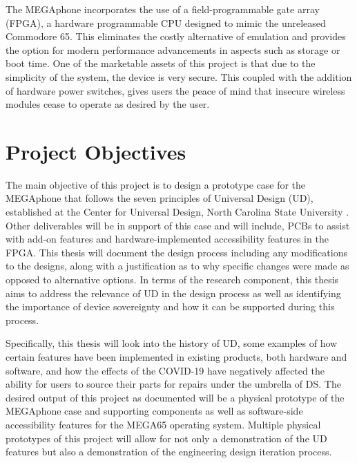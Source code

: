 The MEGAphone incorporates the use of a field-programmable gate array (FPGA), a hardware programmable CPU designed to mimic the unreleased Commodore 65.
This eliminates the costly alternative of emulation and provides the option for modern performance advancements in aspects such as storage or boot time.
One of the marketable assets of this project is that due to the simplicity of the system, the device is very secure.
This coupled with the addition of hardware power switches, gives users the peace of mind that insecure wireless modules cease to operate as desired by the user.

\section{Project Objectives}

The main objective of this project is to design a prototype case for the MEGAphone that follows the seven principles of Universal Design (UD), established at the Center for Universal Design, North Carolina State University \cite{sevenprinciples}. 
Other deliverables will be in support of this case and will include, PCBs to assist with add-on features and hardware-implemented accessibility features in the FPGA.
This thesis will document the design process including any modifications to the designs, along with a justification as to why specific changes were made as opposed to alternative options.
In terms of the research component, this thesis aims to address the relevance of UD in the design process as well as identifying the importance of device sovereignty and how it can be supported during this process.

Specifically, this thesis will look into the history of UD, some examples of how certain features have been implemented in existing products, both hardware and software, and how the effects of the COVID-19 have negatively affected the ability for users to source their parts for repairs under the umbrella of DS.
The desired output of this project as documented will be a physical prototype of the MEGAphone case and supporting components as well as software-side accessibility features for the MEGA65 operating system.
Multiple physical prototypes of this project will allow for not only a demonstration of the UD features but also a demonstration of the engineering design iteration process.
 
